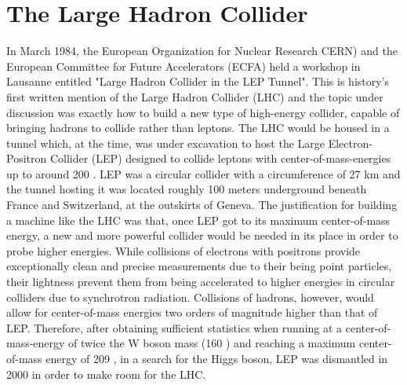 \section{The Large Hadron Collider}
In March 1984, the European Organization for Nuclear Research CERN) and the European Committee for Future Accelerators (ECFA) 
held a workshop in Lausanne entitled "Large Hadron Collider in the LEP Tunnel". 
This is history's first written mention of the Large Hadron Collider (LHC) and the topic under discussion 
was exactly how to build a new type of high-energy collider, capable of bringing hadrons
to collide rather than leptons.
The LHC would be housed in a tunnel which, at the time, was under excavation to host the Large Electron-Positron Collider (LEP) designed to collide leptons with center-of-mass-energies up to around 200 \GeV.
LEP was a circular collider with a circumference of 27 km and the tunnel hosting it was located roughly 100 meters underground beneath France and Switzerland, at the outskirts of Geneva. 
The justification for building a machine like the LHC was that, once LEP got to its maximum center-of-mass energy, a new and more powerful collider would be needed in its place in order to probe higher energies.
While collisions of electrons with positrons provide exceptionally clean and precise measurements due to their being point particles,
 their lightness prevent them from being accelerated to higher energies in circular colliders due to synchrotron radiation. Collisions of hadrons, however, would allow for center-of-mass energies two orders of magnitude higher than that of LEP. Therefore, after obtaining sufficient statistics when running at a center-of-mass-energy of twice the W boson mass (160 \GeV) and reaching a maximum center-of-mass energy of 209 \GeV, in a search for the Higgs boson, LEP was dismantled in 2000 in order to make room for the LHC.
 
